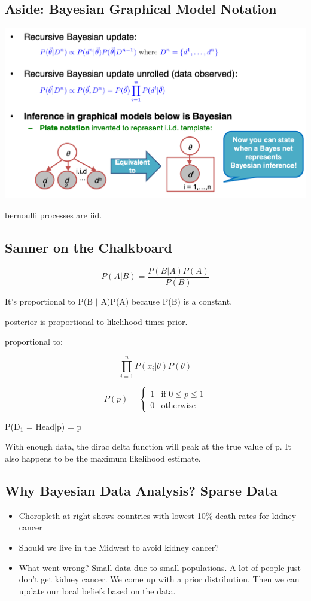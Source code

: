 \documentclass[11pt]{article}
\theoremstyle{definition}
\begin{document}
\subsection{Aside: Bayesian Graphical Model Notation}
\includegraphics[width=\textwidth/2]{11.png}

bernoulli processes are iid.

\subsection{Sanner on the Chalkboard}

\begin{equation}
    P(A|B) = \frac{P(B|A)P(A)}{P(B)}
\end{equation}

It's proportional to P(B $\vert$ A)P(A) because P(B) is a constant.

posterior is proportional to likelihood times prior.

proportional to:

\begin{equation}
    \prod_{i=1}^{n} P(x_i|\theta)P(\theta)
\end{equation}

\[
P(p) =
\begin{cases} 
1 & \text{if } 0 \leq p \leq 1 \\
0 & \text{otherwise}
\end{cases}
\]

P(D$_1$ = Head$|$p) = p

With enough data, the dirac delta function will peak at the true value of p.
It also happens to be the maximum likelihood estimate.

\subsection{Why Bayesian Data Analysis? Sparse Data}
\begin{itemize}
    \item Choropleth at
    right shows
    countries with
    lowest 10\% death
    rates for kidney
    cancer
    \item Should we live in
    the Midwest to
    avoid kidney
    cancer?
    \item What went
    wrong? Small data due to small populations.
    A lot of people just don't get kidney cancer.
    We come up with a prior distribution.
    Then we can update our local beliefs based on the data.
\end{itemize}
\end{document}
